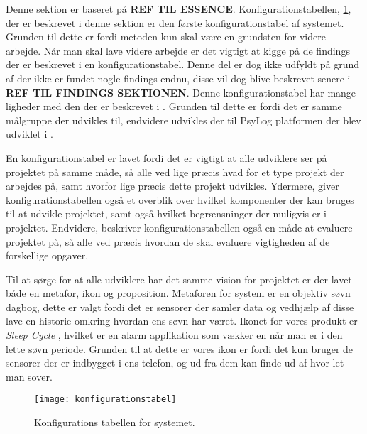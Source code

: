 Denne sektion er baseret på \textbf{REF TIL ESSENCE}.
Konfigurationstabellen, \cref{tab:konfigurationsTabel}, der er beskrevet i denne sektion er den første konfigurationstabel af systemet.
Grunden til dette er fordi metoden kun skal være en grundsten for videre arbejde.
Når man skal lave videre arbejde er det vigtigt at kigge på de findings der er beskrevet i en konfigurationstabel.
Denne del er dog ikke udfyldt på grund af der ikke er fundet nogle findings endnu, disse vil dog blive beskrevet senere i \textbf{REF TIL FINDINGS SEKTIONEN}.
Denne konfigurationstabel har mange ligheder med den der er beskrevet i \citet{misc:faellesrapp}.
Grunden til dette er fordi det er samme målgruppe der udvikles til, endvidere udvikles der til PsyLog platformen der blev udviklet i \citet{misc:faellesrapp}.

En konfigurationstabel er lavet fordi det er vigtigt at alle udviklere ser på projektet på samme måde, så alle ved lige præcis hvad for et type projekt der arbejdes på, samt hvorfor lige præcis dette projekt udvikles.
Ydermere, giver konfigurationstabellen også et overblik over hvilket komponenter der kan bruges til at udvikle projektet, samt også hvilket begrænsninger der muligvis er i projektet.
Endvidere, beskriver konfigurationstabellen også en måde at evaluere projektet på, så alle ved præcis hvordan de skal evaluere vigtigheden af de forskellige opgaver.

Til at sørge for at alle udviklere har det samme vision for projektet er der lavet både en metafor, ikon og proposition.
Metaforen for system er en objektiv søvn dagbog, dette er valgt fordi det er sensorer der samler data og vedhjælp af disse lave en historie omkring hvordan ens søvn har været.
Ikonet for vores produkt er \textit{Sleep Cycle} \citep{misc:sleepCycle}, hvilket er en alarm applikation som vækker en når man er i den lette søvn periode.
Grunden til at dette er vores ikon er fordi det kun bruger de sensorer der er indbygget i ens telefon, og ud fra dem kan finde ud af hvor let man sover.

\begin{figure}[h]
\texttt{[image: konfigurationstabel]}
\caption{Konfigurations tabellen for systemet.}
\label{tab:konfigurationsTabel}
\end{figure}
